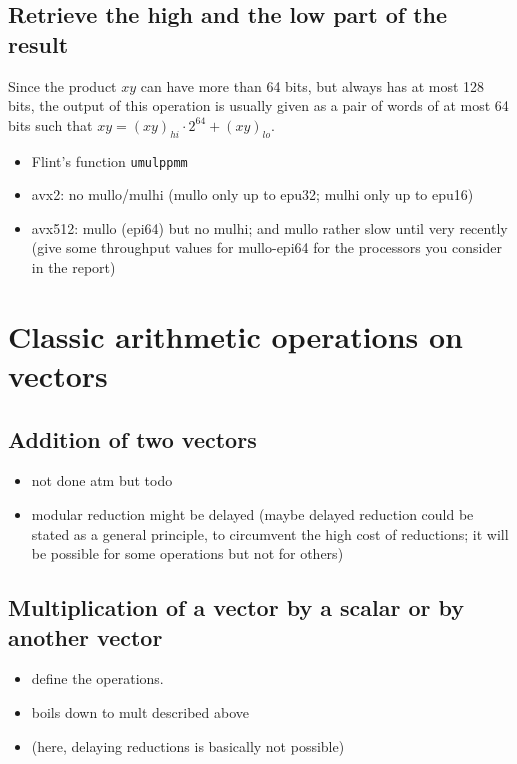 \documentclass[a4paper]{article}
\begin{document}
\subsection{Retrieve the high and the low part of the result}

Since the product $xy$ can have more than 64 bits, but always has at most 128 bits, the output of this operation is usually given as a pair of words of at most 64 
bits such that $xy = (xy)_{hi}\cdot 2^{64} + (xy)_{lo}$.

\begin{itemize}
    \item Flint's function \texttt{umulppmm}
    \item avx2: no mullo/mulhi (mullo only up to epu32; mulhi only up to epu16)
    \item avx512: mullo (epi64) but no mulhi; and mullo rather slow until very recently (give some throughput values for mullo-epi64 for the processors you consider in the report)
\end{itemize} 

\section{Classic arithmetic operations on vectors}

\subsection{Addition of two vectors}

\begin{itemize}
    \item not done atm but todo 
    \item modular reduction might be delayed
      (maybe delayed reduction could be stated as a general principle,
      to circumvent the high cost of reductions;
      it will be possible for some operations but not for others)
\end{itemize}

\subsection{Multiplication of a vector by a scalar or by another vector}

\begin{itemize}
    \item define the operations.
    \item boils down to mult described above
    \item (here, delaying reductions is basically not possible)
\end{itemize}
\end{document}
